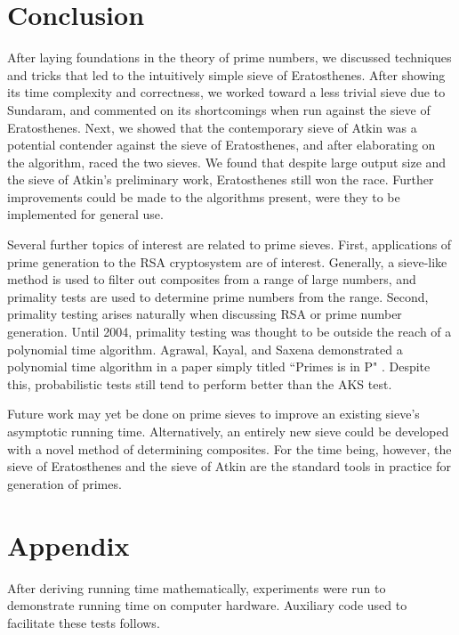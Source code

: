\documentclass{amsart}
\theoremstyle{definition}
\theoremstyle{case}
\begin{document}
	\section{Conclusion}
	
	After laying foundations in the theory of prime numbers, we discussed techniques and tricks that led to the intuitively simple sieve of Eratosthenes. After showing its time complexity and correctness, we worked toward a less trivial sieve due to Sundaram, and commented on its shortcomings when run against the sieve of Eratosthenes. Next, we showed that the contemporary sieve of Atkin was a potential contender against the sieve of Eratosthenes, and after elaborating on the algorithm, raced the two sieves. We found that despite large output size and the sieve of Atkin's preliminary work, Eratosthenes still won the race. Further improvements could be made to the algorithms present, were they to be implemented for general use. 
	
	Several further topics of interest are related to prime sieves. First, applications of prime generation to the RSA cryptosystem are of interest. Generally, a sieve-like method is used to filter out composites from a range of large numbers, and primality tests are used to determine prime numbers from the range. Second, primality testing arises naturally when discussing RSA or prime number generation. Until 2004, primality testing was thought to be outside the reach of a polynomial time algorithm. Agrawal, Kayal, and Saxena demonstrated a polynomial time algorithm in a paper simply titled ``Primes is in P" \cite{MR2123939}. Despite this, probabilistic tests still tend to perform better than the AKS test.
	
	Future work may yet be done on prime sieves to improve an existing sieve's asymptotic running time. Alternatively, an entirely new sieve could be developed with a novel method of determining composites. For the time being, however, the sieve of Eratosthenes and the sieve of Atkin are the standard tools in practice for generation of primes.
	

	\section*{Appendix}
	
	After deriving running time mathematically, experiments were run to demonstrate running time on computer hardware. Auxiliary code used to facilitate these tests follows.
	
\end{document}
